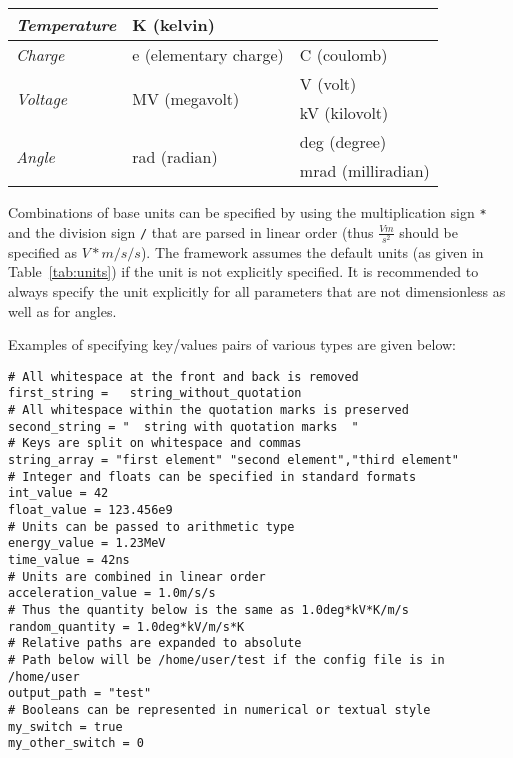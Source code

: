 \begin{table}[tbp]
\begin{tabular}{|l|l|l|}
\textit{Temperature}              & K (kelvin)                              &                          \\ \hline
\textit{Charge}                   & e (elementary charge)                   & C (coulomb)              \\ \hline
\multirow{2}{*}{\textit{Voltage}} & \multirow{2}{*}{MV (megavolt)}          & V (volt)                 \\ \cline{3-3}
                                  &                                         & kV (kilovolt)            \\ \hline
\multirow{2}{*}{\textit{Angle}}   & \multirow{2}{*}{rad (radian)}           & deg (degree)             \\ \cline{3-3}
                                  &                                         & mrad (milliradian)       \\ \hline
\end{tabular}
\end{table}

Combinations of base units can be specified by using the multiplication sign \texttt{*} and the division sign \texttt{/} that are parsed in linear order (thus $\frac{V m}{s^2}$ should be specified as $V*m/s/s$).
The framework assumes the default units (as given in Table~\ref{tab:units}) if the unit is not explicitly specified.
It is recommended to always specify the unit explicitly for all parameters that are not dimensionless as well as for angles.

Examples of specifying key/values pairs of various types are given below:
\begin{verbatim}
# All whitespace at the front and back is removed
first_string =   string_without_quotation
# All whitespace within the quotation marks is preserved
second_string = "  string with quotation marks  "
# Keys are split on whitespace and commas
string_array = "first element" "second element","third element"
# Integer and floats can be specified in standard formats
int_value = 42
float_value = 123.456e9
# Units can be passed to arithmetic type
energy_value = 1.23MeV
time_value = 42ns
# Units are combined in linear order
acceleration_value = 1.0m/s/s
# Thus the quantity below is the same as 1.0deg*kV*K/m/s
random_quantity = 1.0deg*kV/m/s*K
# Relative paths are expanded to absolute
# Path below will be /home/user/test if the config file is in /home/user
output_path = "test"
# Booleans can be represented in numerical or textual style
my_switch = true
my_other_switch = 0
\end{verbatim}

